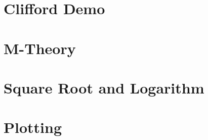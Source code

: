 \section{Clifford Demo}

\section{M-Theory}

\section{Square Root and Logarithm}

\section{Plotting}
